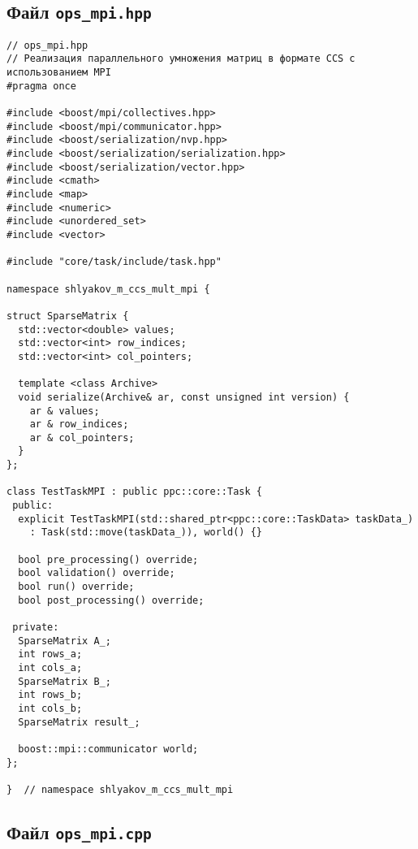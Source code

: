 \documentclass[12pt]{article}
\begin{document}
\subsection*{Файл \texttt{ops\_mpi.hpp}}

\begin{verbatim}
// ops_mpi.hpp
// Реализация параллельного умножения матриц в формате CCS с использованием MPI
#pragma once

#include <boost/mpi/collectives.hpp>
#include <boost/mpi/communicator.hpp>
#include <boost/serialization/nvp.hpp>
#include <boost/serialization/serialization.hpp>
#include <boost/serialization/vector.hpp>
#include <cmath>
#include <map>
#include <numeric>
#include <unordered_set>
#include <vector>

#include "core/task/include/task.hpp"

namespace shlyakov_m_ccs_mult_mpi {

struct SparseMatrix {
  std::vector<double> values;
  std::vector<int> row_indices;
  std::vector<int> col_pointers;

  template <class Archive>
  void serialize(Archive& ar, const unsigned int version) {
    ar & values;
    ar & row_indices;
    ar & col_pointers;
  }
};

class TestTaskMPI : public ppc::core::Task {
 public:
  explicit TestTaskMPI(std::shared_ptr<ppc::core::TaskData> taskData_) 
    : Task(std::move(taskData_)), world() {}
  
  bool pre_processing() override;
  bool validation() override;
  bool run() override;
  bool post_processing() override;

 private:
  SparseMatrix A_;
  int rows_a;
  int cols_a;
  SparseMatrix B_;
  int rows_b;
  int cols_b;
  SparseMatrix result_;

  boost::mpi::communicator world;
};

}  // namespace shlyakov_m_ccs_mult_mpi
\end{verbatim}

\subsection*{Файл \texttt{ops\_mpi.cpp}}
\end{document}
